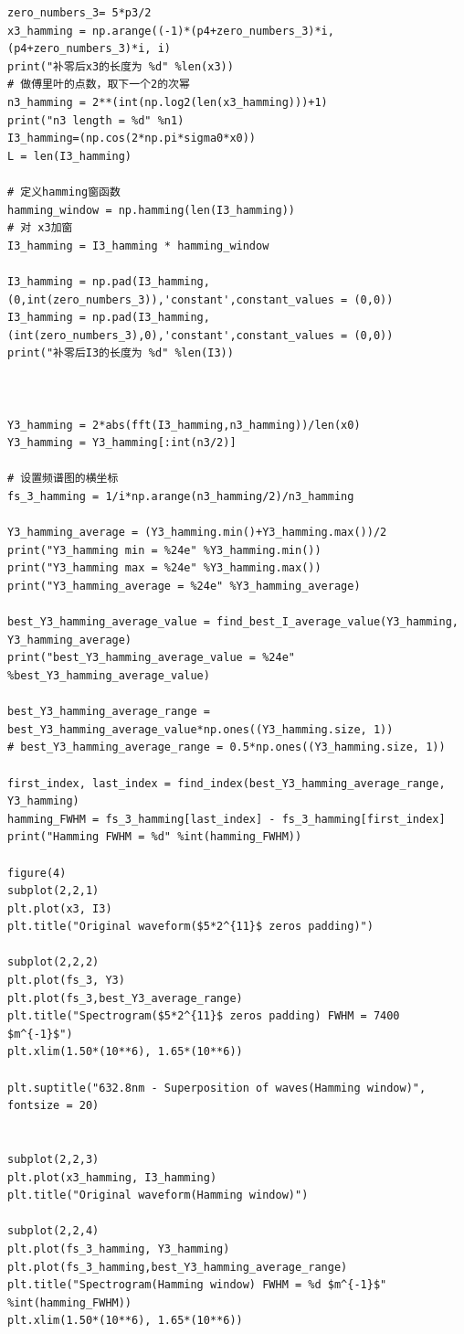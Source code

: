 \documentclass[conference]{IEEEtran}
\begin{document}
\begin{lstlisting}
zero_numbers_3= 5*p3/2
x3_hamming = np.arange((-1)*(p4+zero_numbers_3)*i, (p4+zero_numbers_3)*i, i)
print("补零后x3的长度为 %d" %len(x3)) 
# 做傅里叶的点数，取下一个2的次幂
n3_hamming = 2**(int(np.log2(len(x3_hamming)))+1)
print("n3 length = %d" %n1)
I3_hamming=(np.cos(2*np.pi*sigma0*x0))
L = len(I3_hamming)

# 定义hamming窗函数
hamming_window = np.hamming(len(I3_hamming))
# 对 x3加窗
I3_hamming = I3_hamming * hamming_window

I3_hamming = np.pad(I3_hamming,(0,int(zero_numbers_3)),'constant',constant_values = (0,0))
I3_hamming = np.pad(I3_hamming,(int(zero_numbers_3),0),'constant',constant_values = (0,0))
print("补零后I3的长度为 %d" %len(I3)) 



Y3_hamming = 2*abs(fft(I3_hamming,n3_hamming))/len(x0)
Y3_hamming = Y3_hamming[:int(n3/2)]

# 设置频谱图的横坐标
fs_3_hamming = 1/i*np.arange(n3_hamming/2)/n3_hamming

Y3_hamming_average = (Y3_hamming.min()+Y3_hamming.max())/2
print("Y3_hamming min = %24e" %Y3_hamming.min())
print("Y3_hamming max = %24e" %Y3_hamming.max())
print("Y3_hamming_average = %24e" %Y3_hamming_average)

best_Y3_hamming_average_value = find_best_I_average_value(Y3_hamming, Y3_hamming_average)
print("best_Y3_hamming_average_value = %24e" %best_Y3_hamming_average_value)

best_Y3_hamming_average_range = best_Y3_hamming_average_value*np.ones((Y3_hamming.size, 1))
# best_Y3_hamming_average_range = 0.5*np.ones((Y3_hamming.size, 1))

first_index, last_index = find_index(best_Y3_hamming_average_range, Y3_hamming)
hamming_FWHM = fs_3_hamming[last_index] - fs_3_hamming[first_index]
print("Hamming FWHM = %d" %int(hamming_FWHM))

figure(4)
subplot(2,2,1)
plt.plot(x3, I3)
plt.title("Original waveform($5*2^{11}$ zeros padding)")

subplot(2,2,2)
plt.plot(fs_3, Y3)
plt.plot(fs_3,best_Y3_average_range)
plt.title("Spectrogram($5*2^{11}$ zeros padding) FWHM = 7400 $m^{-1}$")
plt.xlim(1.50*(10**6), 1.65*(10**6))

plt.suptitle("632.8nm - Superposition of waves(Hamming window)", fontsize = 20)


subplot(2,2,3)
plt.plot(x3_hamming, I3_hamming)
plt.title("Original waveform(Hamming window)")

subplot(2,2,4)
plt.plot(fs_3_hamming, Y3_hamming)
plt.plot(fs_3_hamming,best_Y3_hamming_average_range)
plt.title("Spectrogram(Hamming window) FWHM = %d $m^{-1}$" %int(hamming_FWHM))
plt.xlim(1.50*(10**6), 1.65*(10**6))



\end{lstlisting}
\end{document}
